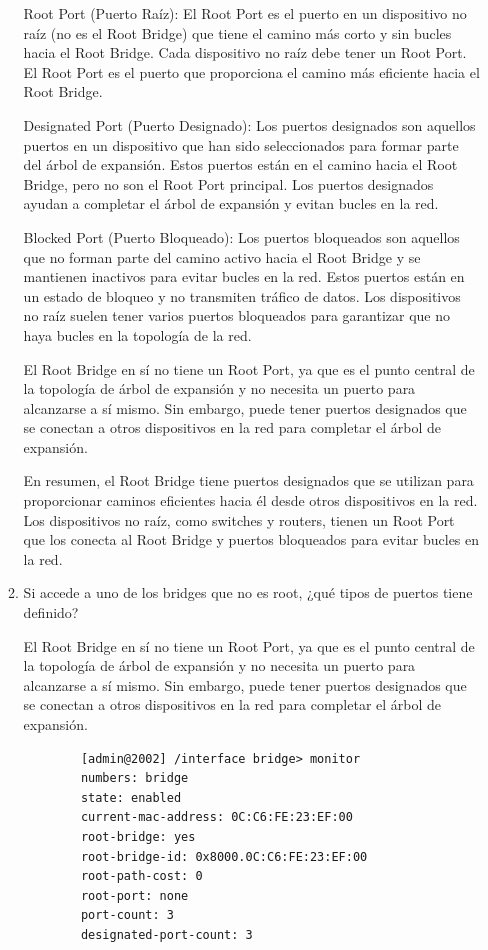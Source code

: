 \documentclass[a4paper]{article}
\begin{document}
\begin{enumerate}
\begin{enumerate}
	Root Port (Puerto Raíz): El Root Port es el puerto en un dispositivo no raíz (no es el Root Bridge) que tiene el camino más corto y sin bucles hacia el Root Bridge. Cada dispositivo no raíz debe tener un Root Port. El Root Port es el puerto que proporciona el camino más eficiente hacia el Root Bridge.
	
	Designated Port (Puerto Designado): Los puertos designados son aquellos puertos en un dispositivo que han sido seleccionados para formar parte del árbol de expansión. Estos puertos están en el camino hacia el Root Bridge, pero no son el Root Port principal. Los puertos designados ayudan a completar el árbol de expansión y evitan bucles en la red.
	
	Blocked Port (Puerto Bloqueado): Los puertos bloqueados son aquellos que no forman parte del camino activo hacia el Root Bridge y se mantienen inactivos para evitar bucles en la red. Estos puertos están en un estado de bloqueo y no transmiten tráfico de datos. Los dispositivos no raíz suelen tener varios puertos bloqueados para garantizar que no haya bucles en la topología de la red.
	
	El Root Bridge en sí no tiene un Root Port, ya que es el punto central de la topología de árbol de expansión y no necesita un puerto para alcanzarse a sí mismo. Sin embargo, puede tener puertos designados que se conectan a otros dispositivos en la red para completar el árbol de expansión.
	
	En resumen, el Root Bridge tiene puertos designados que se utilizan para proporcionar caminos eficientes hacia él desde otros dispositivos en la red. Los dispositivos no raíz, como switches y routers, tienen un Root Port que los conecta al Root Bridge y puertos bloqueados para evitar bucles en la red.
	\item Si accede a uno de los bridges que no es root, ¿qué tipos
	de puertos tiene definido?
	
	El Root Bridge en sí no tiene un Root Port, ya que es el punto central de la topología de árbol de expansión y no necesita un puerto para alcanzarse a sí mismo. Sin embargo, puede tener puertos designados que se conectan a otros dispositivos en la red para completar el árbol de expansión.
		
	\begin{lstlisting}
		[admin@2002] /interface bridge> monitor
		numbers: bridge
		state: enabled
		current-mac-address: 0C:C6:FE:23:EF:00
		root-bridge: yes
		root-bridge-id: 0x8000.0C:C6:FE:23:EF:00
		root-path-cost: 0
		root-port: none
		port-count: 3
		designated-port-count: 3
		

\end{lstlisting}
\end{enumerate}
\end{enumerate}
\end{document}
